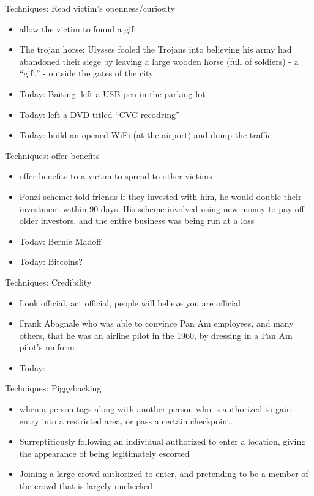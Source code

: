 \documentclass{beamer}
\begin{document}
\begin{frame}{Techniques: Read victim's openness/curiosity}
  \begin{itemize}
    \item allow the victim to found a gift
    \item The trojan horse: Ulysses fooled the Trojans into believing
       his army had abandoned their siege by leaving a large
      wooden horse (full of soldiers) - a ``gift'' - outside the gates of the city
    \item Today: Baiting: left a USB pen in the parking lot
    \item Today: left a DVD titled ``CVC recodring''
    \item Today: build an opened WiFi (at the airport) and dump the traffic
  \end{itemize}
\end{frame}

\begin{frame}{Techniques: offer benefits}
  \begin{itemize}
    \item offer benefits to a victim to spread to other victims
    \item Ponzi scheme:  told friends if they invested with him, he
      would double their investment within 90 days. His scheme
      involved using new money to pay off older investors, and the
      entire business was being run at a loss
    \item Today: Bernie Madoff
    \item Today: Bitcoins?
  \end{itemize}
\end{frame}

\begin{frame}{Techniques: Credibility}
  \begin{itemize}
    \item Look official, act official, people will believe you are official
    \item Frank Abagnale who was able to
      convince Pan Am employees, and many others, that he was an
      airline pilot in the 1960, by dressing in a Pan Am pilot's uniform
    \item Today: 
  \end{itemize}
\end{frame}


\begin{frame}{Techniques: Piggybacking}

  \begin{itemize}
    \item when a person tags along with
another person who is authorized to gain entry into a restricted area,
or pass a certain checkpoint.
    \item Surreptitiously following an individual authorized to enter
      a location, giving the appearance of being legitimately escorted
    \item Joining a large crowd authorized to enter, and pretending to
      be a member of the crowd that is largely unchecked
  \end{itemize}

\end{frame}
\end{document}
